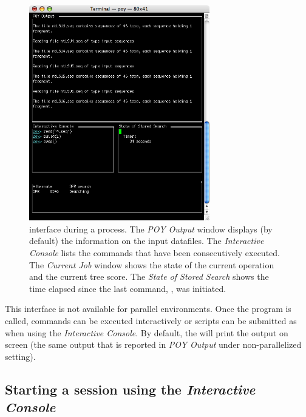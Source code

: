 \begin{figure}[htbp]
   \centering
   \includegraphics[width=0.7\textwidth]{figures/figprocess.jpg}
   \caption{\poy interface during a process. The \emph{POY Output} window displays (by default) the information on the input datafiles. The \emph{Interactive Console} lists the commands that have been consecutively executed. The \emph{Current Job} window shows the state of the current operation and the current tree score. The \emph{State of Stored Search} shows the time elapsed  since the last command, , was initiated.}
   \label{fig:figprocess}
\end{figure}

This \poy interface is not available for parallel environments. Once the program is called, \poy commands can be executed interactively or scripts can be submitted as when using the \emph{Interactive Console}. By default, the \poy will print the output on screen (the same output that is reported in \emph{POY Output} under non-parallelized setting).

\subsection{Starting a \poy session using the \emph{Interactive Console}}

